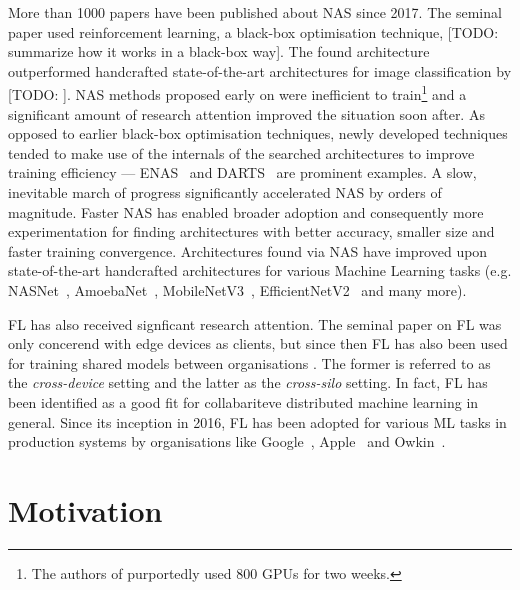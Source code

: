 More than 1000 papers have been published about NAS since 2017. The seminal paper \cite{nas_with_rl_2017} used reinforcement learning, a black-box optimisation technique, [TODO: summarize how it works in a black-box way]. The found architecture outperformed handcrafted state-of-the-art architectures for image classification by [TODO: ]. NAS methods proposed early on were inefficient to train\footnote{The authors of \cite{nas_with_rl_2017} purportedly used 800 GPUs for two weeks.} and a significant amount of research attention improved the situation soon after. As opposed to earlier black-box optimisation techniques, newly developed techniques tended to make use of the internals of the searched architectures to improve training efficiency — ENAS~\cite{enas_2018} and DARTS~\cite{darts_2019} are prominent examples. A slow, inevitable march of progress significantly accelerated NAS by orders of magnitude. Faster NAS has enabled broader adoption and consequently more experimentation for finding architectures with better accuracy, smaller size and faster training convergence. Architectures found via NAS have improved upon state-of-the-art handcrafted architectures for various Machine Learning tasks (e.g. NASNet~\cite{nasnet_2018}, AmoebaNet~\cite{amoebanet_2019}, MobileNetV3~\cite{mobilenetv3_2019}, EfficientNetV2~\cite{efficientnetv2_2021} and many more).

FL has also received signficant research attention. The seminal paper on FL \cite{fl_seminal_2017} was only concerend with edge devices as clients, but since then FL has also been used for training shared models between organisations \cite{fl_multi-institutional_2020} \cite{fl_covid-19_2021} \cite{cross-silo_vertical_horizontal_fl_2022}. The former is referred to as the \textit{cross-device} setting and the latter as the \textit{cross-silo} setting. In fact, FL has been identified as a good fit for collabariteve distributed machine learning \cite{cdml_2024} in general. Since its inception in 2016, FL has been adopted for various ML tasks in production systems by organisations like Google~\cite{gboard_fl_2018}, Apple~\cite{apple_fl_case_study_2025} and Owkin~\cite{owkin_fl_drug_discovery_in_prod_2022}.

\section{Motivation}

